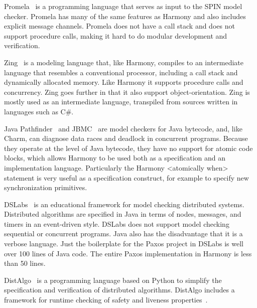 \documentclass[twocolumn]{article}
\begin{document}
Promela~\cite{SPIN} is a programming language that serves as input
to the SPIN model checker.  Promela has many of the same features
as Harmony and also includes explicit message channels.  Promela
does not have a call stack and does not support procedure calls,
making it hard to do modular development and verification.

Zing~\cite{Zing} is a modeling language that, like Harmony, compiles to an
intermediate language that resembles a conventional processor,
including a call stack and dynamically allocated memory.  Like
Harmony it supports procedure calls and concurrency.  Zing goes
further in that it also support object-orientation.  Zing is
mostly used as an intermediate language, transpiled from sources
written in languages such as C\#.

Java Pathfinder~\cite{Pathfinder} and JBMC~\cite{JBMC} are model
checkers for Java bytecode, and,
like Charm, can diagnose data races and deadlock in concurrent
programs.  Because they operate at the level of Java bytecode, they
have no support for atomic code blocks, which allows Harmony to be
used both as a specification and an implementation language.
Particularly the Harmony <{atomically when}> statement is very
useful as a specification construct, for example to specify new
synchronization primitives.

DSLabs~\cite{MWA19} is an educational framework for model checking distributed
systems.  Distributed algorithms are specified in Java in terms of
nodes, messages, and timers in an event-driven style.  DSLabs does not
support model checking sequential or concurrent programs.  Java
also has the disadvantage that it is a verbose language.  Just the
boilerplate for the Paxos project in DSLabs is well over 100 lines
of Java code.  The entire Paxos implementation in Harmony is less
than 50 lines.

Dist\-Algo~\cite{DistAlgo} is a programming language based on Python to
simplify the specification and verification of distributed algorithms.
Dist\-Algo includes a framework for runtime checking of safety and liveness
properties~\cite{LS20}.



\end{document}
